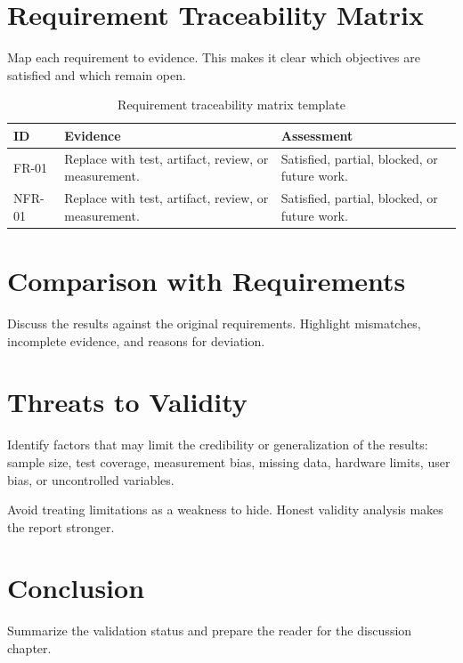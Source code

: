 \section{Requirement Traceability Matrix}
Map each requirement to evidence. This makes it clear which objectives are satisfied and which remain open.

\begin{table}[H]
    \centering
    \caption{Requirement traceability matrix template}
    \label{tab:requirement-traceability-template}
    \small
    \begin{tabular}{L{0.14\textwidth}L{0.34\textwidth}L{0.34\textwidth}}
        \toprule
        \textbf{ID} & \textbf{Evidence} & \textbf{Assessment} \\
        \midrule
        FR-01 & Replace with test, artifact, review, or measurement. & Satisfied, partial, blocked, or future work. \\
        \tabrowsep
        NFR-01 & Replace with test, artifact, review, or measurement. & Satisfied, partial, blocked, or future work. \\
        \bottomrule
    \end{tabular}
\end{table}

\section{Comparison with Requirements}
Discuss the results against the original requirements. Highlight mismatches, incomplete evidence, and reasons for deviation.

\section{Threats to Validity}
Identify factors that may limit the credibility or generalization of the results: sample size, test coverage, measurement bias, missing data, hardware limits, user bias, or uncontrolled variables.

Avoid treating limitations as a weakness to hide. Honest validity analysis makes the report stronger.

\section{Conclusion}
Summarize the validation status and prepare the reader for the discussion chapter.
